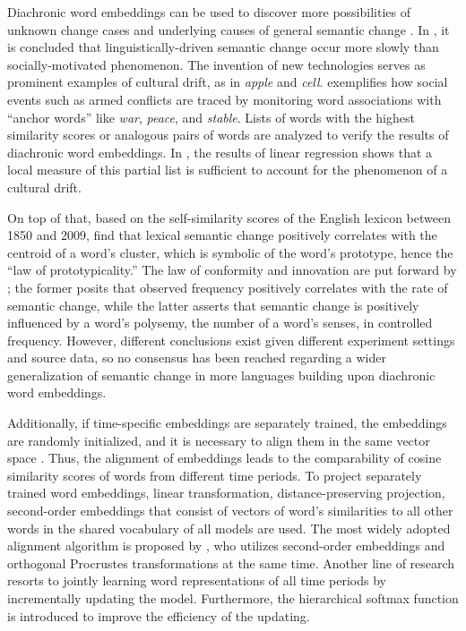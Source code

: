 Diachronic word embeddings can be used to discover more possibilities of unknown change cases and underlying causes of general semantic change \parencite{hamilton2016cultural}. In \textcite{hamilton2016cultural}, it is concluded that linguistically-driven semantic change occur more slowly than socially-motivated phenomenon. The invention of new technologies serves as prominent examples of cultural drift, as in \textit{apple} and \textit{cell}. \textcite{kutuzov2017tracing} exemplifies how social events such as armed conflicts are traced by monitoring word associations with ``anchor words'' like \textit{war}, \textit{peace}, and \textit{stable}. Lists of words with the highest similarity scores or analogous pairs of words are analyzed to verify the results of diachronic word embeddings. In \textcite{hamilton2016cultural}, the results of linear regression shows that a local measure of this partial list is sufficient to account for the phenomenon of a cultural drift.

On top of that, based on the self-similarity scores of the English lexicon between 1850 and 2009, \textcite{dubossarsky2015bottom} find that lexical semantic change positively correlates with the centroid of a word's cluster, which is symbolic of the word's prototype, hence the ``law of prototypicality.'' The law of conformity and innovation are put forward by \textcite{hamilton2016law}; the former posits that observed frequency positively correlates with the rate of semantic change, while the latter asserts that semantic change is positively influenced by a word's polysemy, the number of a word's senses, in controlled frequency. However, different conclusions exist given different experiment settings and source data, so no consensus has been reached regarding a wider generalization of semantic change in more languages building upon diachronic word embeddings.%

Additionally, if time-specific embeddings are separately trained, the embeddings are randomly initialized, and it is necessary to align them in the same vector space \parencite{hamilton2016law}. Thus, the alignment of embeddings leads to the comparability of cosine similarity scores of words from different time periods. To project separately trained word embeddings, linear transformation, distance-preserving projection, second-order embeddings that consist of vectors of word's similarities to all other words in the shared vocabulary of all models are used. The most widely adopted alignment algorithm is proposed by \textcite{hamilton2016law}, who utilizes second-order embeddings and orthogonal Procrustes transformations at the same time. Another line of research resorts to jointly learning word representations of all time periods by incrementally updating the model. Furthermore, the hierarchical softmax function is introduced to improve the efficiency of the updating.

